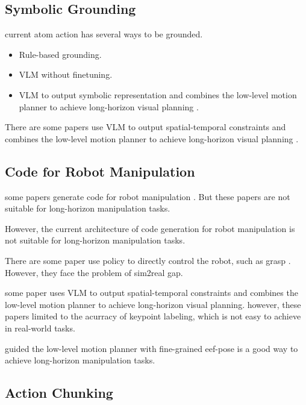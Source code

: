 \documentclass{article}
\begin{document}
\subsection{Symbolic Grounding}

current atom action has several ways to be grounded.

\begin{itemize}
    \item Rule-based grounding.
    \item VLM without finetuning.
    \item VLM to output symbolic representation and combines the low-level motion planner to achieve long-horizon visual planning \cite{mu2024robocodex}.
\end{itemize}



There are some papers use VLM to output spatial-temporal constraints and combines the low-level motion planner to achieve long-horizon visual planning \cite{huang2024rekep,zhou2024codeasmonitor}.


\subsection{Code for Robot Manipulation}

some papers generate code for robot manipulation \cite{mu2024robocodex}. But these papers are not suitable for long-horizon manipulation tasks.

However, the current architecture of code generation for robot manipulation is not suitable for long-horizon manipulation tasks.

There are some paper use policy to directly control the robot, such as grasp \cite{wang2023dexgraspnet}. However, they face the problem of sim2real gap.


some paper uses VLM to output spatial-temporal constraints and combines the low-level motion planner to achieve long-horizon visual planning.
\cite{huang2024rekep,zhou2024codeasmonitor} however, these papers limited to the acurracy of keypoint labeling, which is not easy to achieve in real-world tasks.


guided the low-level motion planner with fine-grained eef-pose is a good way to achieve long-horizon manipulation tasks.

\subsection{Action Chunking}
\end{document}

